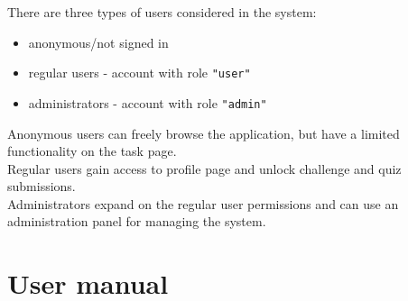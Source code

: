 There are three types of users considered in the system:

\begin{itemize}
    \item anonymous/not signed in
    \item regular users - account with role \texttt{"user"}
    \item administrators - account with role \texttt{"admin"}
\end{itemize}

Anonymous users can freely browse the application, but have a limited functionality on the task page.\\
Regular users gain access to profile page and unlock challenge and quiz submissions.\\
Administrators expand on the regular user permissions and can use an administration panel for managing the system.

\section{User manual}
